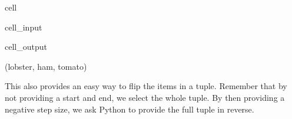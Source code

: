 \documentclass[letterpaper,10pt,english]{jupyterBook}
\begin{document}
\begin{sphinxuseclass}{cell}\begin{sphinxVerbatimInput}

\begin{sphinxuseclass}{cell_input}
\begin{sphinxVerbatim}[commandchars=\\\{\}]
\PYG{p}{[}\PYG{p}{]}
\end{sphinxVerbatim}

\end{sphinxuseclass}\end{sphinxVerbatimInput}
\begin{sphinxVerbatimOutput}

\begin{sphinxuseclass}{cell_output}
\begin{sphinxVerbatim}[commandchars=\\\{\}]
(\PYGZsq{}lobster\PYGZsq{}, \PYGZsq{}ham\PYGZsq{}, \PYGZsq{}tomato\PYGZsq{})
\end{sphinxVerbatim}

\end{sphinxuseclass}\end{sphinxVerbatimOutput}

\end{sphinxuseclass}
\sphinxAtStartPar
This also provides an easy way to flip the items in a tuple. Remember that by not providing a start and end, we select the whole tuple. By then providing a negative step size, we ask Python to provide the full tuple in reverse.
\end{document}
